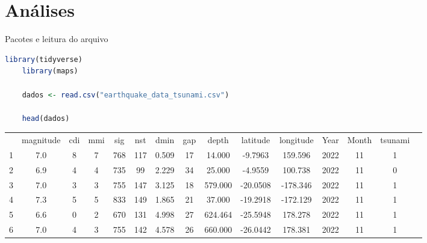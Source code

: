 \documentclass[aspectratio= 169, xcolor=dvipsnames]{beamer}
\begin{document}
\section{Análises}
\begin{frame}[fragile]{Pacotes e leitura do arquivo}
    \begin{lstlisting}[language=R]
    library(tidyverse)
    library(maps)

    dados <- read.csv("earthquake_data_tsunami.csv")

    head(dados)
    \end{lstlisting}
    \begin{block}{}
        \begin{table}[h]
        \tiny
        \centering
        \begin{tabular}{ccccccccccccccc}
         & magnitude & cdi & mmi & sig & nst & dmin & gap & depth & latitude & longitude & Year & Month & tsunami \\
        1 & 7.0 & 8 & 7 & 768 & 117 & 0.509 & 17 & 14.000  & -9.7963  & 159.596  & 2022 & 11 & 1 \\
        2 & 6.9 & 4 & 4 & 735 &  99 & 2.229 & 34 & 25.000  & -4.9559  & 100.738  & 2022 & 11 & 0 \\
        3 & 7.0 & 3 & 3 & 755 & 147 & 3.125 & 18 & 579.000 & -20.0508 & -178.346 & 2022 & 11 & 1 \\
        4 & 7.3 & 5 & 5 & 833 & 149 & 1.865 & 21 & 37.000  & -19.2918 & -172.129 & 2022 & 11 & 1 \\
        5 & 6.6 & 0 & 2 & 670 & 131 & 4.998 & 27 & 624.464 & -25.5948 & 178.278  & 2022 & 11 & 1 \\
        6 & 7.0 & 4 & 3 & 755 & 142 & 4.578 & 26 & 660.000 & -26.0442 & 178.381  & 2022 & 11 & 1
        \end{tabular}
        \end{table}
    \end{block}
\end{frame}
\end{document}
